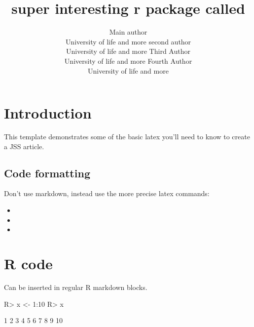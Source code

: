 \documentclass[article]{jss}
\author{
Main author\\University of life and more \And second author\\University of life and more \And Third Author\\University of life and more \And Fourth Author\\University of life and more
}
\title{super interesting r package called \pkg{TheSuperPackage}}
\providecommand{\tightlist}{%
  \setlength{\itemsep}{0pt}\setlength{\parskip}{0pt}}
\begin{document}
\section{Introduction}\label{introduction}

This template demonstrates some of the basic latex you'll need to know
to create a JSS article.

\subsection{Code formatting}\label{code-formatting}

Don't use markdown, instead use the more precise latex commands:

\begin{itemize}
\tightlist
\item
\item
\item
\end{itemize}

\section{R code}\label{r-code}

Can be inserted in regular R markdown blocks.

\begin{CodeChunk}

\begin{CodeInput}
R> x <- 1:10
R> x
\end{CodeInput}

\begin{CodeOutput}
 [1]  1  2  3  4  5  6  7  8  9 10
\end{CodeOutput}
\end{CodeChunk}


\end{document}
